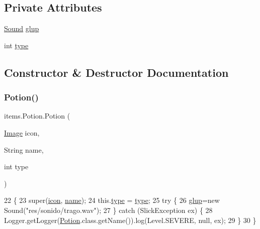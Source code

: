 \subsection*{Private Attributes}
\begin{DoxyCompactItemize}
\item 
\mbox{\hyperlink{classorg_1_1newdawn_1_1slick_1_1_sound}{Sound}} \mbox{\hyperlink{classitems_1_1_potion_a4f366c06faf54019df1c647f470b4f66}{glup}}
\item 
int \mbox{\hyperlink{classitems_1_1_potion_a9f9bc89fd8dfdadc0fa0101b725c524e}{type}}
\end{DoxyCompactItemize}


\subsection{Constructor \& Destructor Documentation}
\mbox{\label{classitems_1_1_potion_ab2a46630762ff8d852c72333029252e5}} 
\subsubsection{\texorpdfstring{Potion()}{Potion()}}
{\footnotesize\ttfamily items.\+Potion.\+Potion (\begin{DoxyParamCaption}\item[{\mbox{\hyperlink{classorg_1_1newdawn_1_1slick_1_1_image}{Image}}}]{icon,  }\item[{String}]{name,  }\item[{int}]{type }\end{DoxyParamCaption})\hspace{0.3cm}{\ttfamily [inline]}}


\begin{DoxyCode}
22                                                     \{
23         super(\mbox{\hyperlink{classitems_1_1_item_afa445ad011d48c3455b0c04bec2581f9}{icon}}, \mbox{\hyperlink{classitems_1_1_item_a086327df1ba046bbbe3fa2f753226d73}{name}});
24         this.\mbox{\hyperlink{classitems_1_1_potion_a9f9bc89fd8dfdadc0fa0101b725c524e}{type}} = \mbox{\hyperlink{classitems_1_1_potion_a9f9bc89fd8dfdadc0fa0101b725c524e}{type}};
25         \textcolor{keywordflow}{try} \{
26             \mbox{\hyperlink{classitems_1_1_potion_a4f366c06faf54019df1c647f470b4f66}{glup}}=\textcolor{keyword}{new} Sound(\textcolor{stringliteral}{"res/sonido/trago.wav"});
27         \} \textcolor{keywordflow}{catch} (SlickException ex) \{
28             Logger.getLogger(\mbox{\hyperlink{classitems_1_1_potion_ab2a46630762ff8d852c72333029252e5}{Potion}}.class.getName()).log(Level.SEVERE, null, ex);
29         \}
30     \}
\end{DoxyCode}


